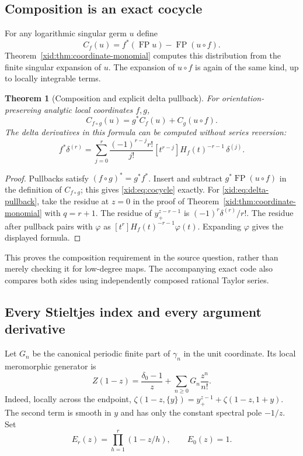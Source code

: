 \documentclass[11pt,a4paper]{article}
\numberwithin{equation}{section}
\newtheorem{theorem}{Theorem}[section]
\theoremstyle{definition}
\theoremstyle{remark}
\DeclareMathOperator{\FP}{FP}
\begin{document}
\subsection{Composition is an exact cocycle}

For any logarithmic singular germ $u$ define
\[
 C_f(u)=f^*(\FP u)-\FP(u\circ f).
\]
Theorem~\ref{xid:thm:coordinate-monomial} computes this distribution from the
finite singular expansion of $u$.  The expansion of $u\circ f$ is
again of the same kind, up to locally integrable terms.

\begin{theorem}[Composition and explicit delta pullback]
\label{xid:thm:cocycle}
For orientation-preserving analytic local coordinates $f,g$,
\begin{equation}\label{xid:eq:cocycle}
 C_{f\circ g}(u)=g^*C_f(u)+C_g(u\circ f).
\end{equation}
The delta derivatives in this formula can be computed without series
reversion:
\begin{equation}\label{xid:eq:delta-pullback}
 f^*\delta^{(r)}
 =\sum_{j=0}^r\frac{(-1)^{r-j}r!}{j!}
     [t^{r-j}]H_f(t)^{-r-1}\,\delta^{(j)}.
\end{equation}
\end{theorem}

\begin{proof}
Pullbacks satisfy $(f\circ g)^*=g^*f^*$.  Insert and subtract
$g^*\FP(u\circ f)$ in the definition of $C_{f\circ g}$; this gives
\eqref{xid:eq:cocycle} exactly.  For \eqref{xid:eq:delta-pullback}, take the
residue at $z=0$ in the proof of Theorem~\ref{xid:thm:coordinate-monomial}
with $q=r+1$.  The residue of $y_+^{z-r-1}$ is
$(-1)^r\delta^{(r)}/r!$.  The residue after pullback pairs with
$\varphi$ as $[t^r]H_f(t)^{-r-1}\varphi(t)$.
Expanding $\varphi$ gives the displayed formula.
\end{proof}

This proves the composition requirement in the source question, rather
than merely checking it for low-degree maps.  The accompanying exact
code also compares both sides using independently composed rational
Taylor series.

\subsection{Every Stieltjes index and every argument derivative}

Let $G_n$ be the canonical periodic finite part of $\gamma_n$ in the
unit coordinate.  Its local meromorphic generator is
\begin{equation}\label{xid:eq:periodic-G-local}
 Z(1-z)=\frac{\delta_0-1}{z}
          +\sum_{n\ge0}G_n\frac{z^n}{n!}.
\end{equation}
Indeed, locally across the endpoint,
$\zeta(1-z,\{y\})=y_+^{z-1}+\zeta(1-z,1+y)$.
The second term is smooth in $y$ and has only the constant spectral
pole $-1/z$.  Set
\begin{equation}\label{xid:eq:Er}
 E_r(z)=\prod_{h=1}^r(1-z/h),\qquad E_0(z)=1.
\end{equation}
\end{document}
